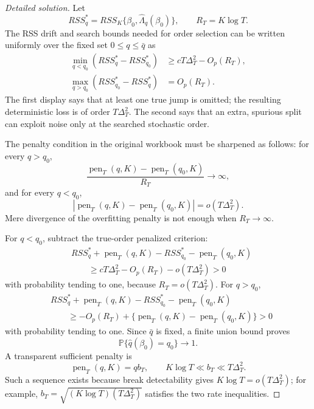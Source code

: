\documentclass[12pt]{article}
\numberwithin{equation}{section}
\theoremstyle{definition}
\newcommand{\Pp}{\mathbb P}
\begin{document}
\begin{proof}[Detailed solution]
Let
\[
    RSS_q^*=RSS_K\{\beta_0,\widehat\Lambda_q(\beta_0)\},
    \qquad R_T=K\log T.
\]
The RSS drift and search bounds needed for order selection can be written
uniformly over the fixed set \(0\leq q\leq\bar q\) as
\begin{align}
    \min_{q<q_0}(RSS_q^*-RSS_{q_0}^*)
      &\geq cT\Delta_T^2-O_p(R_T),
      \label{eq:sol-underfit-gap}\\
    \max_{q>q_0}(RSS_{q_0}^*-RSS_q^*)
      &=O_p(R_T).
      \label{eq:sol-overfit-gain}
\end{align}
The first display says that at least one true jump is omitted; the resulting
deterministic loss is of order \(T\Delta_T^2\).  The second says that an
extra, spurious split can exploit noise only at the searched stochastic order.

The penalty condition in the original workbook must be sharpened as follows:
for every \(q>q_0\),
\[
    \frac{\operatorname{pen}_T(q,K)-
          \operatorname{pen}_T(q_0,K)}{R_T}\longrightarrow\infty,
\]
and for every \(q<q_0\),
\[
    \left|\operatorname{pen}_T(q,K)-
          \operatorname{pen}_T(q_0,K)\right|
    =o(T\Delta_T^2).
\]
Mere divergence of the overfitting penalty is not enough when
\(R_T\to\infty\).

For \(q<q_0\), subtract the true-order penalized criterion:
\begin{align*}
    &RSS_q^*+\operatorname{pen}_T(q,K)
      -RSS_{q_0}^*-\operatorname{pen}_T(q_0,K)\\
    &\qquad\geq
      cT\Delta_T^2-O_p(R_T)-o(T\Delta_T^2)>0
\end{align*}
with probability tending to one, because
\(R_T=o(T\Delta_T^2)\).  For \(q>q_0\),
\begin{align*}
    &RSS_q^*+\operatorname{pen}_T(q,K)
      -RSS_{q_0}^*-\operatorname{pen}_T(q_0,K)\\
    &\qquad\geq
      -O_p(R_T)+
      \{\operatorname{pen}_T(q,K)-
        \operatorname{pen}_T(q_0,K)\}>0
\end{align*}
with probability tending to one.  Since \(\bar q\) is fixed, a finite union
bound proves
\[
    \Pp\{\widehat q(\beta_0)=q_0\}\to1.
\]
A transparent sufficient penalty is
\[
    \operatorname{pen}_T(q,K)=q b_T,
    \qquad
    K\log T\ll b_T\ll T\Delta_T^2.
\]
Such a sequence exists because break detectability gives
\(K\log T=o(T\Delta_T^2)\); for example,
\(b_T=\sqrt{(K\log T)(T\Delta_T^2)}\) satisfies the two rate inequalities.
\end{proof}
\end{document}
